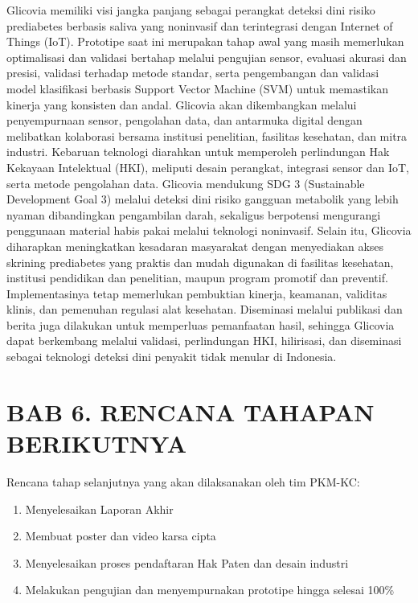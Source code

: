 \documentclass[12pt,a4paper]{article}
\begin{document}
Glicovia memiliki visi jangka panjang sebagai perangkat deteksi dini risiko prediabetes berbasis saliva yang noninvasif dan terintegrasi dengan Internet of Things (IoT). Prototipe saat ini merupakan tahap awal yang masih memerlukan optimalisasi dan validasi bertahap melalui pengujian sensor, evaluasi akurasi dan presisi, validasi terhadap metode standar, serta pengembangan dan validasi model klasifikasi berbasis Support Vector Machine (SVM) untuk memastikan kinerja yang konsisten dan andal. Glicovia akan dikembangkan melalui penyempurnaan sensor, pengolahan data, dan antarmuka digital dengan melibatkan kolaborasi bersama institusi penelitian, fasilitas kesehatan, dan mitra industri. Kebaruan teknologi diarahkan untuk memperoleh perlindungan Hak Kekayaan Intelektual (HKI), meliputi desain perangkat, integrasi sensor dan IoT, serta metode pengolahan data. Glicovia mendukung SDG 3 (Sustainable Development Goal 3) melalui deteksi dini risiko gangguan metabolik yang lebih nyaman dibandingkan pengambilan darah, sekaligus berpotensi mengurangi penggunaan material habis pakai melalui teknologi noninvasif. Selain itu, Glicovia diharapkan meningkatkan kesadaran masyarakat dengan menyediakan akses skrining prediabetes yang praktis dan mudah digunakan di fasilitas kesehatan, institusi pendidikan dan penelitian, maupun program promotif dan preventif. Implementasinya tetap memerlukan pembuktian kinerja, keamanan, validitas klinis, dan pemenuhan regulasi alat kesehatan. Diseminasi melalui publikasi dan berita juga dilakukan untuk memperluas pemanfaatan hasil, sehingga Glicovia dapat berkembang melalui validasi, perlindungan HKI, hilirisasi, dan diseminasi sebagai teknologi deteksi dini penyakit tidak menular di Indonesia.

\section*{BAB 6. RENCANA TAHAPAN BERIKUTNYA}

Rencana tahap selanjutnya yang akan dilaksanakan oleh tim PKM-KC:
\begin{enumerate}
    \item Menyelesaikan Laporan Akhir
    \item Membuat poster dan video karsa cipta
    \item Menyelesaikan proses pendaftaran Hak Paten dan desain industri
    \item Melakukan pengujian dan menyempurnakan prototipe hingga selesai 100\%
\end{enumerate}
\end{document}
